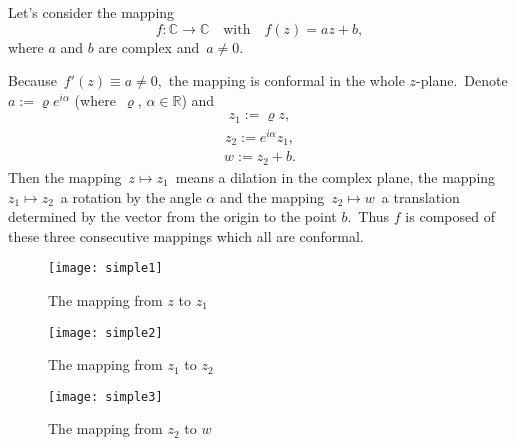 \documentclass[12pt]{article}
\theoremstyle{definition}
\begin{document}
Let's consider the mapping
$$f\colon \mathbb{C}\to\mathbb{C} \quad \mathrm{with}\quad f(z) = az\!+\!b,$$
where $a$ and $b$ are complex  and\, $a \neq 0$.

Because\, $f'(z) \equiv a \neq 0$,\, the mapping is conformal in the whole 
$z$-plane.\, Denote\, $\displaystyle a := \varrho e^{i\alpha}$ (where\, $\varrho,\,\alpha \in\mathbb{R}$) and
\begin{align}
z_1 := \varrho z,
\end{align}
\begin{align}
z_2 := e^{i\alpha}z_1,
\end{align}
\begin{align}
w := z_2\!+\!b.
\end{align}
Then the mapping\, $z\mapsto z_1$\, means a dilation in the complex plane, the mapping\, $z_1\mapsto z_2$\, a rotation by the angle $\alpha$ and the mapping\, $z_2\mapsto w$\, a translation determined by the vector from the origin to the point $b$.\, Thus $f$ is composed of these three consecutive mappings which all are conformal.

\begin{figure}
\begin{center}
\texttt{[image: simple1]}
\end{center}
\caption{The mapping from $z$ to $z_1$}
\end{figure}

\begin{figure}
\begin{center}
\texttt{[image: simple2]}
\end{center}
\caption{The mapping from $z_1$ to $z_2$}
\end{figure}

\begin{figure}
\begin{center}
\texttt{[image: simple3]}
\end{center}
\caption{The mapping from $z_2$ to $w$}
\end{figure}

\end{document}
